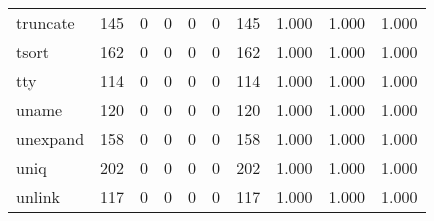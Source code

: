 \begin{longtable}{lp{2.0cm}p{2.0cm}p{2.0cm}p{2.0cm}p{2.0cm}p{2.0cm}p{2.0cm}p{2.0cm}p{2.0cm}}
truncate  &                    145 &                                  0 &                                 0 &                                0 &                                 0 &                             145 &                                   1.000 &                                  1.000 &                                1.000 \\
tsort     &                    162 &                                  0 &                                 0 &                                0 &                                 0 &                             162 &                                   1.000 &                                  1.000 &                                1.000 \\
tty       &                    114 &                                  0 &                                 0 &                                0 &                                 0 &                             114 &                                   1.000 &                                  1.000 &                                1.000 \\
uname     &                    120 &                                  0 &                                 0 &                                0 &                                 0 &                             120 &                                   1.000 &                                  1.000 &                                1.000 \\
unexpand  &                    158 &                                  0 &                                 0 &                                0 &                                 0 &                             158 &                                   1.000 &                                  1.000 &                                1.000 \\
uniq      &                    202 &                                  0 &                                 0 &                                0 &                                 0 &                             202 &                                   1.000 &                                  1.000 &                                1.000 \\
unlink    &                    117 &                                  0 &                                 0 &                                0 &                                 0 &                             117 &                                   1.000 &                                  1.000 &                                1.000 \\

\end{longtable}
